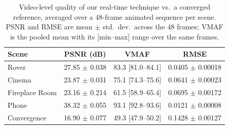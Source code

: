 \begin{table}[t]
\centering
\small
\caption{Video-level quality of our real-time technique vs.\ a converged reference, averaged over a 48-frame animated sequence per scene. PSNR and RMSE are mean $\pm$ std.\ dev.\ across the 48 frames; VMAF is the pooled mean with its [min--max] range over the same frames.}
\label{tab:video}
\begin{tabular}{l c c c}
\toprule
Scene & PSNR (dB) & VMAF & RMSE \\
\midrule
Rover & 27.85 $\pm$ 0.038 & 83.3 [81.0--84.1] & 0.0405 $\pm$ 0.00018 \\
Cinema & 23.87 $\pm$ 0.031 & 75.1 [74.3--75.6] & 0.0641 $\pm$ 0.00023 \\
Fireplace Room & 23.16 $\pm$ 0.214 & 61.5 [58.9--65.4] & 0.0695 $\pm$ 0.00172 \\
Phone & 38.32 $\pm$ 0.055 & 93.1 [92.8--93.6] & 0.0121 $\pm$ 0.00008 \\
Convergence & 16.90 $\pm$ 0.077 & 49.3 [47.9--50.2] & 0.1428 $\pm$ 0.00127 \\
\bottomrule
\end{tabular}
\end{table}
